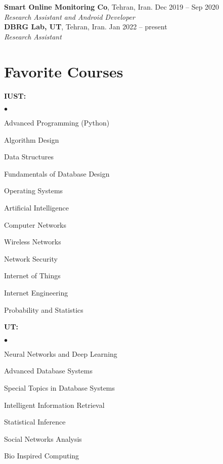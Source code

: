 \documentclass[margin,line]{res}
\newenvironment{list2}{
  \begin{list}{$\bullet$}{%
      \setlength{\itemsep}{0in}
      \setlength{\parsep}{0in} \setlength{\parskip}{0in}
      \setlength{\topsep}{0in} \setlength{\partopsep}{0in}
      \setlength{\leftmargin}{0.2in}}}{\end{list}}
\begin{document}
\begin{resume}
{\bf Smart Online Monitoring Co}, Tehran, Iran. \hfill{Dec 2019 -- Sep 2020}\\
{\em Research Assistant and Android Developer  }\\

{\bf DBRG Lab, UT}, Tehran, Iran. \hfill{Jan 2022 -- present}\\
{\em Research Assistant  }\\

\section{\sc Favorite Courses}
{\bf  IUST:}\\
\begin{list2}
\item  Advanced Programming (Python)\\
\item  Algorithm Design\\
\item  Data Structures\\
\item  Fundamentals of Database Design\\
\item  Operating Systems \\
\item  Artificial Intelligence \\
\item  Computer Networks\\
\item  Wireless Networks\\
\item  Network Security\\
\item  Internet of Things \\
\item  Internet Engineering\\
\item  Probability and Statistics\\
\end{list2}
{\bf UT:}\\
\begin{list2}
\item  Neural Networks and Deep Learning\\
\item  Advanced Database Systems\\
\item  Special Topics in Database Systems\\
\item  Intelligent Information Retrieval\\
\item  Statistical Inference\\
\item  Social Networks Analysis\\
\item  Bio Inspired Computing\\
\end{list2}
\end{resume}
\end{document}
